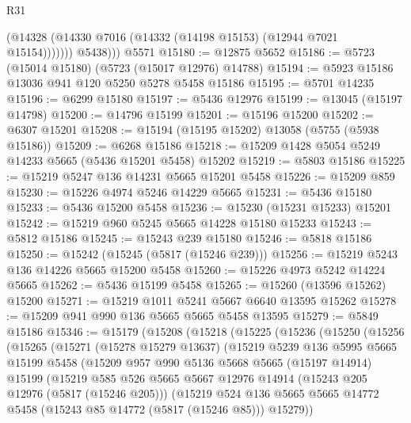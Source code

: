 \begin{lexlean}{R31}
\begin{coremodule}
              (@14328 (@14330 @7016 (@14332 (@14198 @15153) (@12944 @7021 @15154)))))))
          @5438)))
    @5571
@15180 := @12875 @5652
@15186 := @5723 (@15014 @15180) (@5723 (@15017 @12976) @14788)
@15194 := @5923 @15186 @13036 @941 @120 @5250 @5278 @5458 @15186
@15195 := @5701 @14235
@15196 := @6299 @15180
@15197 := @5436 @12976
@15199 := @13045 (@15197 @14798)
@15200 := @14796 @15199
@15201 := @15196 @15200
@15202 := @6307 @15201
@15208 := @15194 (@15195 @15202) @13058 (@5755 (@5938 @15186))
@15209 := @6268 @15186
@15218 := @15209 @1428 @5054 @5249 @14233 @5665 (@5436 @15201 @5458) @15202
@15219 := @5803 @15186
@15225 := @15219 @5247 @136 @14231 @5665 @15201 @5458
@15226 := @15209 @859
@15230 := @15226 @4974 @5246 @14229 @5665
@15231 := @5436 @15180
@15233 := @5436 @15200 @5458
@15236 := @15230 (@15231 @15233) @15201
@15242 := @15219 @960 @5245 @5665 @14228 @15180 @15233
@15243 := @5812 @15186
@15245 := @15243 @239 @15180
@15246 := @5818 @15186
@15250 := @15242 (@15245 (@5817 (@15246 @239)))
@15256 := @15219 @5243 @136 @14226 @5665 @15200 @5458
@15260 := @15226 @4973 @5242 @14224 @5665
@15262 := @5436 @15199 @5458
@15265 := @15260 (@13596 @15262) @15200
@15271 := @15219 @1011 @5241 @5667 @6640 @13595 @15262
@15278 := @15209 @941 @990 @136 @5665 @5665 @5458 @13595
@15279 := @5849 @15186
@15346 := @15179
    (@15208
      (@15218
        (@15225
          (@15236
            (@15250
              (@15256
                (@15265
                  (@15271
                    (@15278 @15279 @13637)
                    (@15219
                      @5239
                      @136
                      @5995
                      @5665
                      @15199
                      @5458
                      (@15209
                        @957
                        @990
                        @5136
                        @5668
                        @5665
                        (@15197 @14914)
                        @15199
                        (@15219
                          @585
                          @526
                          @5665
                          @5667
                          @12976
                          @14914
                          (@15243 @205 @12976 (@5817 (@15246 @205)))
                          (@15219
                            @524
                            @136
                            @5665
                            @5665
                            @14772
                            @5458
                            (@15243 @85 @14772 (@5817 (@15246 @85)))
                            @15279))

\end{coremodule}
\end{lexlean}
